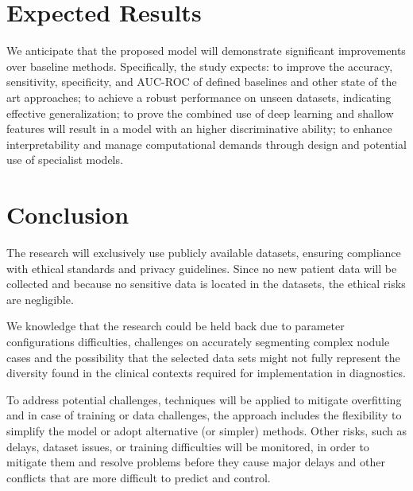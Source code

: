 \section{Expected Results}

We anticipate that the proposed model will demonstrate significant improvements over baseline methods. Specifically, the study expects: to improve the accuracy, sensitivity, specificity, and AUC-ROC of defined baselines and other state of the art approaches; to achieve a robust performance on unseen datasets, indicating effective generalization; to prove the combined use of deep learning and shallow features will result in a model with an higher discriminative ability; to enhance interpretability and manage computational demands through design and potential use of specialist models.


\section{Conclusion}

The research will exclusively use publicly available datasets, ensuring compliance with ethical standards and privacy guidelines. Since no new patient data will be collected and because no sensitive data is located in the datasets, the ethical risks are negligible.

We knowledge that the research could be held back due to parameter configurations difficulties, challenges on accurately segmenting complex nodule cases and the possibility that the selected data sets might not fully represent the diversity found in the clinical contexts required for implementation in diagnostics.


To address potential challenges, techniques will be applied to mitigate overfitting and in case of training or data challenges, the approach includes the flexibility to simplify the model or adopt alternative (or simpler) methods.
Other risks, such as delays, dataset issues, or training difficulties will be monitored, in order to mitigate them and resolve problems before they cause major delays and other conflicts that are more difficult to predict and control.

